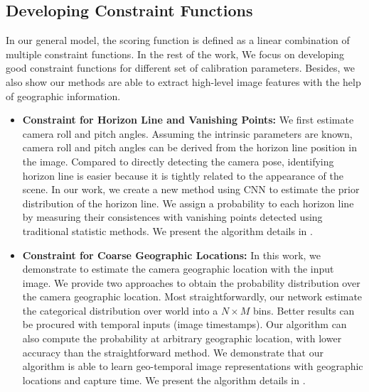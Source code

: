 \subsection{Developing Constraint Functions}
In our general model, the scoring function is defined as a linear
combination of multiple constraint functions.
In the rest of the work, We focus on developing good constraint
functions for different set of calibration parameters. Besides, we
also show our methods are able to extract high-level image features
with the help of geographic information.

\begin{itemize}[noitemsep]
  \item \textbf{Constraint for Horizon Line and Vanishing Points:}
  We first estimate camera roll and pitch angles. Assuming the intrinsic
  parameters are known, camera roll and pitch angles can be
  derived from the horizon line position in the image. Compared to
  directly detecting the camera pose, identifying horizon line is easier
  because it is tightly related to the appearance
  of the scene. In our work, we create a new method using CNN to
  estimate the prior distribution of the horizon line. We assign
  a probability to each horizon line by measuring their consistences
  with vanishing points detected using traditional statistic methods.
  We present the algorithm details in .
  \newline

  \item \textbf{Constraint for Coarse Geographic Locations:}
  In this work, we demonstrate to estimate the camera geographic
  location with the input image.
  We provide two approaches to obtain the probability distribution over the camera
  geographic location. Most straightforwardly, our network estimate the
  categorical distribution over world into a $N \times M$ bins. Better
  results can be procured with temporal inputs (image timestamps).
  Our algorithm can also compute the probability at arbitrary
  geographic location, with lower accuracy than the straightforward
  method.
  We demonstrate that our algorithm is able to learn geo-temporal
  image representations with geographic locations and capture
  time.
  We present the algorithm details in .
  \newline


\end{itemize}
